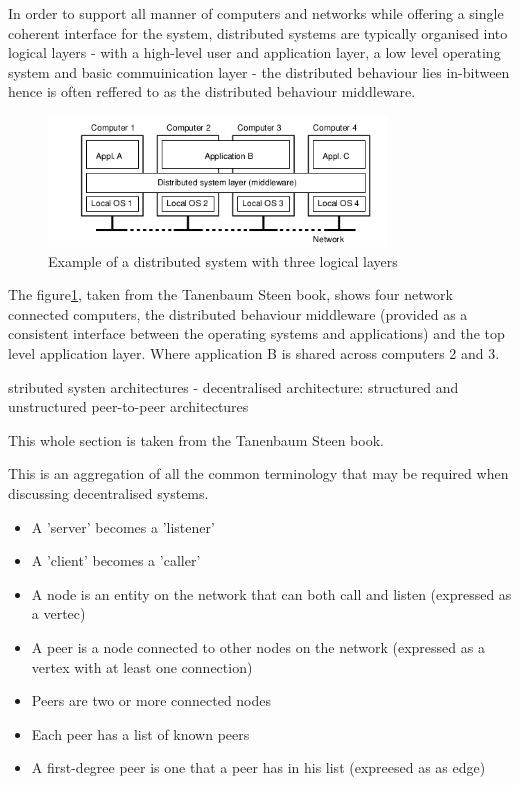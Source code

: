 \documentclass[a4paper]{article}
\begin{document}
In order to support all manner of computers and networks while offering a single coherent interface for the system, distributed systems are typically organised into logical layers - with a high-level user and application layer, a low level operating system and basic commuinication layer - the distributed behaviour lies in-bitween hence is often reffered to as the distributed behaviour middleware.

\begin{figure}
    \centering
    \includegraphics[width=0.8\textwidth]{imgs/Screenshot from 2022-01-17 17-13-57.png}
    \caption{Example of a distributed system with three logical layers}
    \label{fig:example-distributed-system-layers}
\end{figure}

The figure\ref{fig:example-distributed-system-layers}, taken from the Tanenbaum Steen book, shows four network connected computers, the distributed behaviour middleware (provided as a consistent interface between the operating systems and applications) and the top level application layer. Where application B is shared across computers 2 and 3.

stributed systen architectures - decentralised architecture: structured and unstructured peer-to-peer architectures



This whole section is taken from the Tanenbaum Steen book\cite{tanenbaumSteen}. %

This is an aggregation of all the common terminology that may be required when discussing decentralised systems.
\begin{itemize}
    \item A 'server' becomes a 'listener'
    \item A 'client' becomes a 'caller'
    \item A node is an entity on the network that can both call and listen (expressed as a vertec)
    \item A peer is a node connected to other nodes on the network (expressed as a vertex with at least one connection)
    \item Peers are two or more connected nodes
    \item Each peer has a list of known peers
    \item A first-degree peer is one that a peer has in his list (expreesed as as edge)
\end{itemize}
\end{document}
